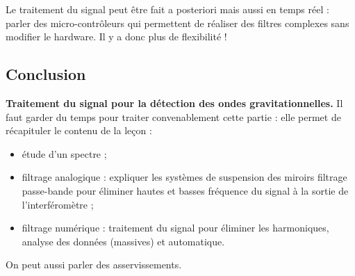 Le traitement du signal peut être fait a posteriori mais aussi en temps réel : parler des micro-contrôleurs qui permettent de réaliser des filtres complexes sans modifier le hardware.
Il y a donc plus de flexibilité !

\subsection*{Conclusion}

\begin{slide}
\textbf{Traitement du signal pour la détection des ondes gravitationnelles.}
Il faut garder du temps pour traiter convenablement cette partie : elle permet de récapituler le contenu de la leçon :
\begin{itemize}
\item étude d'un spectre ;
\item filtrage analogique : expliquer les systèmes de suspension des miroirs filtrage passe-bande pour éliminer hautes et basses fréquence du signal à la sortie de l'interféromètre ;
\item filtrage numérique : traitement du signal pour éliminer les harmoniques, analyse des données (massives) et automatique.
\end{itemize}
\end{slide}

On peut aussi parler des asservissements.

\newpage